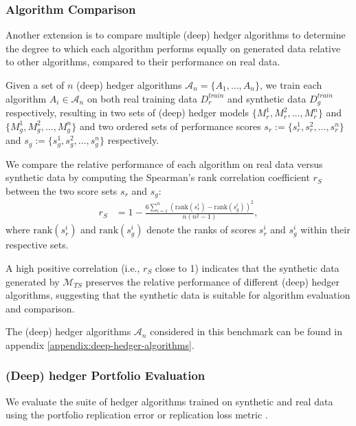       \subsubsection{Algorithm Comparison}
      \label{sec:algorithm-comparison}
      Another extension is to compare multiple (deep) hedger 
      algorithms to determine the degree to which each algorithm 
      performs equally on generated data relative to other algorithms, 
      compared to their performance on real data.

      Given a set of \( n \) (deep) hedger algorithms 
      \( \mathcal{A}_n = \{ A_1, \ldots, A_n \} \), we train 
      each algorithm \( A_i \in \mathcal{A}_n \) on both real 
      training data \( D_r^{train} \) and synthetic data 
      \( D_g^{train} \) respectively, resulting in two sets of 
      (deep) hedger models \(\{M_r^1, M_r^2, \ldots, M_r^n\} \) 
      and \( \{M_g^1, M_g^2, \ldots, M_g^n\} \) and two ordered 
      sets of performance scores 
      \( s_r := \{s_r^1, s_r^2, \ldots, s_r^n\} \) and 
      \( s_g := \{s_g^1, s_g^2, \ldots, s_g^n\} \) respectively.

      We compare the relative performance of each 
      algorithm on real data versus synthetic data by computing 
      the Spearman's rank correlation coefficient \( r_S \) 
      \cite{Lin21} between the two score sets \( s_r \) and 
      \( s_g \):
      \begin{equation}
        \begin{aligned}
          r_S &= 1 - \frac{6 \sum_{i=1}^{n} ( \mathrm{rank}(s_r^i) 
          - \mathrm{rank}(s_g^i) )^2}{n(n^2 - 1)},
        \end{aligned}
        \label{eq:Spearman}
      \end{equation}
      where \( \mathrm{rank}(s_r^i) \) and 
      \( \mathrm{rank}(s_g^i) \) denote the ranks of scores 
      \( s_r^i \) and \( s_g^i \) within their respective sets.

      A high positive correlation (i.e., \( r_S \) 
      close to 1) indicates that the synthetic data 
      generated by \( \mathcal{M}_{TS} \) preserves the relative 
      performance of different (deep) hedger algorithms, suggesting 
      that the synthetic data is suitable for algorithm evaluation 
      and comparison.

      The (deep) hedger algorithms \( \mathcal{A}_n \) considered in 
      this benchmark can be found in appendix 
      \ref{appendix:deep-hedger-algorithms}.

      \subsubsection{(Deep) hedger Portfolio Evaluation}
      We evaluate the suite of hedger algorithms trained on 
      synthetic and real data using the portfolio replication error 
      or replication loss metric \cite{Boursin22}.



